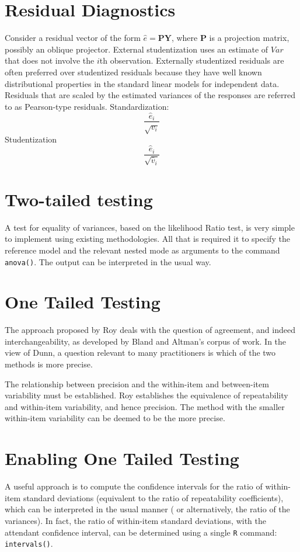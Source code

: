 \documentclass[12pt, a4paper]{report}
\theoremstyle{plain}
\theoremstyle{definition}
\theoremstyle{remark}
\begin{document}
	
	\section{Residual Diagnostics}
	
	Consider a residual vector of the form $\hat{e} = \boldsymbol{PY} $, where $\boldsymbol{P}$ is a projection matrix, possibly an oblique projector.
	External studentization uses an estimate of $Var$ that does not involve the $i$th observation.
	Externally studentized residuals are often preferred over studentized residuals because they have well known distributional
	properties in the standard linear models for independent data.
	Residuals that are scaled by the estimated variances of the responses are referred to as Pearson-type residuals.
	Standardization: \[ \frac{\hat{e}_i}{\sqrt{v_i}}\]
	Studentization \[ \frac{\hat{e}_i}{\sqrt{\hat{v}_i}}\]
	

	\section{Two-tailed testing} A test for equality of variances, based on the likelihood Ratio test, is very simple to implement using existing methodologies. All that is required it to specify the reference model and the relevant nested mode as arguments to the command \texttt{anova()}. The output can be interpreted in the usual way.
	
	\section{One Tailed Testing}
	The approach proposed by Roy deals with the question of agreement, and indeed interchangeability, as developed by Bland and Altman's corpus of work. In the view of Dunn, a question relevant to many practitioners is which of the two methods is more precise.
	
	The relationship between precision and the within-item and between-item variability must be established. Roy establishes the equivalence of repeatability and within-item variability, and hence precision.  The method with the smaller within-item variability can be deemed to be the more precise.
	
	\section{Enabling One Tailed Testing}
	A useful approach is to compute the confidence intervals for the ratio of within-item standard deviations (equivalent to the ratio of repeatability coefficients), which can be interpreted in the usual manner ( or alternatively, the ratio of the variances). In fact, the ratio of within-item standard deviations, with the attendant confidence interval,  can be determined using a single \texttt{R} command: \texttt{intervals()}.
	
\end{document}
